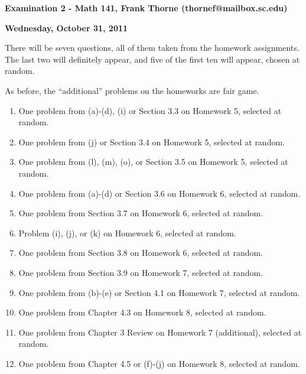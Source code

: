 \documentclass[12pt]{article}
\begin{document}
\setlength{\topmargin}{-2mm}





\begin{center}{\bf Examination 2 - Math 141, Frank Thorne (thornef@mailbox.sc.edu)}
\end{center}
\begin{center}
{\bf Wednesday, October 31, 2011}
\end{center}

There will be seven questions, all of them taken from the homework
assignments. The last two will definitely appear, and five of the first ten
will appear, chosen at random.

As before, the ``additional'' problems on the homeworks are fair game.

\begin{enumerate}[(1)]
\item
One problem from (a)-(d), (i) or Section 3.3 on Homework 5, selected at random.

\item
One problem from (j) or Section 3.4 on Homework 5, selected at random.

\item
One problem from (l), (m), (o), or Section 3.5 on Homework 5, selected at random.

\item
One problem from (a)-(d) or Section 3.6 on Homework 6, selected at random.

\item
One problem from Section 3.7 on Homework 6, selected at random.

\item
Problem (i), (j), or (k) on Homework 6, selected at random.

\item
One problem from Section 3.8 on Homework 6, selected at random.

\item
One problem from Section 3.9 on Homework 7, selected at random.

\item
One problem from (b)-(e) or Section 4.1 on Homework 7, selected at random.

\item
One problem from Chapter 4.3 on Homework 8, selected at random.

\item
One problem from Chapter 3 Review on Homework 7 (additional), selected at
random.

\item
One problem from Chapter 4.5 or (f)-(j) on Homework 8, selected at random.


\end{enumerate}
\end{document}
